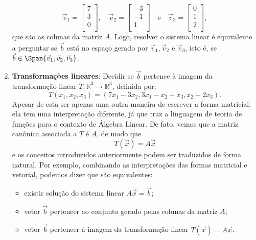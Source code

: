\begin{enumerate}[1.]
\begin{equation}
	\vec{v}_1 = \left[
	\begin{array}{ccc}
	7   \\
	3   \\
	0   \\
	\end{array}
	\right], \quad \vec{v}_2 =
	\left[
	\begin{array}{c}
	-3   \\
	-1   \\
	1   \\
	\end{array}
	\right] \quad \text{e} \quad \vec{v}_3 =
	\left[
	\begin{array}{c}
	0  \\
	1  \\
	2  \\
	\end{array}
	\right],
	\end{equation} que são as colunas da matriz $A$. Logo, resolver o sistema linear é equivalente a perguntar se $\vec{b}$ está no espaço gerado por $\vec{v}_1, \vec{v}_2$ e $\vec{v}_3$, isto é, se $\vec{b} \in \Span\{\vec{v}_1, \vec{v}_2, \vec{v}_3\}$.
	\item \textbf{Transformações lineares}: Decidir se $\vec{b}$ pertence à imagem da transformação linear $T: \mathbb{R}^3 \to \mathbb{R}^3$, definida por:
	\begin{equation}
	T(x_1, x_2, x_3) = (7x_1 - 3x_2, 3x_1 - x_2 + x_3, x_2 + 2x_3).
	\end{equation} Apesar de esta ser apenas uma outra maneira de escrever a forma matricial, ela tem uma interpretação diferente, já que traz a linguagem de teoria de funções para o contexto de Álgebra Linear. De fato, vemos que a matriz canônica associada a $T$ é $A$, de modo que
	\begin{equation}
	T(\vec{x}) = A \vec{x}
	\end{equation} e os conceitos introduzidos anteriormente podem ser traduzidos de forma natural. Por exemplo, combinando as interpretações das formas matricial e vetorial, podemos dizer que são equivalentes:
	\begin{itemize}
		\item existir solução do sistema linear $A \vec{x} = \vec{b}$;
		\item vetor $\vec{b}$ pertencer ao conjunto gerado pelas colunas da matriz $A$;
		\item vetor $\vec{b}$ pertencer à imagem da transformação linear $T(\vec{x}) = A \vec{x}$.
	\end{itemize}
\end{enumerate}


